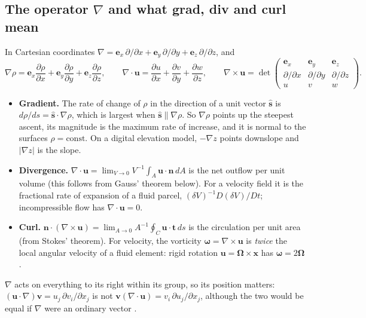 \documentclass[11pt,letterpaper]{article}
\numberwithin{equation}{section}
\newcommand{\uu}{\mathbf{u}}
\newcommand{\xx}{\mathbf{x}}
\newcommand{\nn}{\mathbf{n}}
\newcommand{\tv}{\mathbf{t}}
\newcommand{\e}[1]{\mathbf{e}_{#1}}
\newcommand{\bomega}{\bm{\omega}}
\newcommand{\pd}[2]{\frac{\partial #1}{\partial #2}}
\begin{document}
\subsection{The operator \texorpdfstring{$\nabla$}{nabla} and what grad, div and curl mean}
In Cartesian coordinates $\nabla=\e{x}\,\partial/\partial x+\e{y}\,\partial/\partial y+\e{z}\,\partial/\partial z$, and
\citep[p.~890]{kundu2016}
\begin{equation}
\nabla\rho=\e{x}\pd{\rho}{x}+\e{y}\pd{\rho}{y}+\e{z}\pd{\rho}{z},\qquad
\nabla\cdot\uu=\pd{u}{x}+\pd{v}{y}+\pd{w}{z},\qquad
\nabla\times\uu=\det\begin{pmatrix}\e{x}&\e{y}&\e{z}\\ \partial/\partial x&\partial/\partial y&\partial/\partial z\\ u&v&w\end{pmatrix}.
\end{equation}
\begin{itemize}
  \item \textbf{Gradient.} The rate of change of $\rho$ in the direction of a unit vector $\hat{\mathbf s}$ is
        $d\rho/ds=\hat{\mathbf s}\cdot\nabla\rho$, which is largest when $\hat{\mathbf s}\parallel\nabla\rho$. So $\nabla\rho$
        points up the steepest ascent, its magnitude is the maximum rate of increase, and it is normal to the surfaces
        $\rho=\text{const}$. On a digital elevation model, $-\nabla z$ points downslope and $|\nabla z|$ is the slope.
  \item \textbf{Divergence.} $\nabla\cdot\uu=\lim_{V\to0}V^{-1}\int_A\uu\cdot\nn\,dA$ is the net outflow per unit volume
        (this follows from Gauss' theorem below). For a velocity field it is the fractional rate of expansion of a
        fluid parcel, $(\delta V)^{-1}D(\delta V)/Dt$; incompressible flow has $\nabla\cdot\uu=0$.
  \item \textbf{Curl.} $\nn\cdot(\nabla\times\uu)=\lim_{A\to0}A^{-1}\oint_C\uu\cdot\tv\,ds$ is the circulation per unit
        area (from Stokes' theorem). For velocity, the vorticity $\bomega=\nabla\times\uu$ is \emph{twice} the local
        angular velocity of a fluid element: rigid rotation $\uu=\bm{\Omega}\times\xx$ has $\bomega=2\bm{\Omega}$.
\end{itemize}

\begin{pitfall}
$\nabla$ acts on everything to its right within its group, so its position matters:
$(\uu\cdot\nabla)\mathbf v=u_j\,\partial v_i/\partial x_j$ is not $\mathbf v(\nabla\cdot\uu)=v_i\,\partial u_j/\partial x_j$,
although the two would be equal if $\nabla$ were an ordinary vector \citep[p.~890]{kundu2016}.
\end{pitfall}
\end{document}
